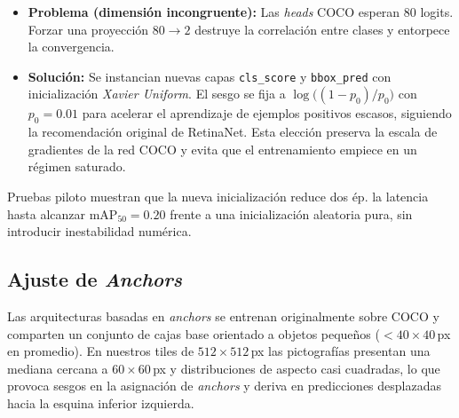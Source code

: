 \begin{itemize}
   \item \textbf{Problema (dimensión incongruente):}
   Las \emph{heads} COCO esperan 80 logits.
   Forzar una proyección \(80\!\rightarrow\!2\) destruye la correlación entre clases y entorpece la convergencia.
   \item \textbf{Solución:}
   Se instancian nuevas capas \texttt{cls\_score} y \texttt{bbox\_pred} con inicialización \emph{Xavier Uniform}.
   El sesgo se fija a \(\log\!\bigl((1-p_0)/p_0\bigr)\) con \(p_0=0.01\) para acelerar el aprendizaje de ejemplos positivos escasos, siguiendo la recomendación original de RetinaNet.
   Esta elección preserva la escala de gradientes de la red COCO y evita que el entrenamiento empiece en un régimen saturado.
\end{itemize}

Pruebas piloto muestran que la nueva inicialización reduce dos ép. la latencia hasta alcanzar \(\text{mAP}_{50}=0.20\) frente a una inicialización aleatoria pura, sin introducir inestabilidad numérica.

\subsection{Ajuste de \emph{Anchors}}\label{ssec:anchors}

Las arquitecturas basadas en \emph{anchors} se entrenan originalmente sobre COCO y comparten un conjunto de cajas base orientado a objetos pequeños (\(<\!40\times40\)\,px en promedio).
En nuestros tiles de \(512\times512\)\,px las pictografías presentan una mediana cercana a \(60\times60\)\,px y distribuciones de aspecto casi cuadradas, lo que provoca sesgos en la asignación de \emph{anchors} y deriva en predicciones desplazadas hacia la esquina inferior izquierda.

